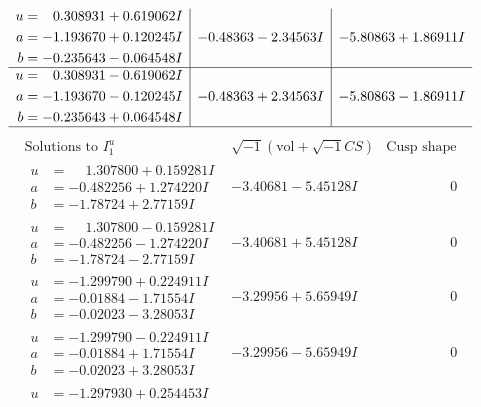 \documentclass[1p]{elsarticle_modified}
\theoremstyle{definition}
\newcommand{\I}{\sqrt{-1}}
\begin{document}
$$\begin{array}{c|c|c}
\begin{aligned}
u &= \phantom{-}0.308931 + 0.619062 I \\
a &= -1.193670 + 0.120245 I \\
b &= -0.235643 - 0.064548 I\end{aligned}
 & -0.48363 - 2.34563 I & -5.80863 + 1.86911 I \\ \hline\begin{aligned}
u &= \phantom{-}0.308931 - 0.619062 I \\
a &= -1.193670 - 0.120245 I \\
b &= -0.235643 + 0.064548 I\end{aligned}
 & -0.48363 + 2.34563 I & -5.80863 - 1.86911 I\\
 \hline 
 \end{array}$$\newpage$$\begin{array}{c|c|c}  
\text{Solutions to }I^u_{1}& \I (\text{vol} + \sqrt{-1}CS) & \text{Cusp shape}\\
 \hline 
\begin{aligned}
u &= \phantom{-}1.307800 + 0.159281 I \\
a &= -0.482256 + 1.274220 I \\
b &= -1.78724 + 2.77159 I\end{aligned}
 & -3.40681 - 5.45128 I & \phantom{-0.000000 } 0 \\ \hline\begin{aligned}
u &= \phantom{-}1.307800 - 0.159281 I \\
a &= -0.482256 - 1.274220 I \\
b &= -1.78724 - 2.77159 I\end{aligned}
 & -3.40681 + 5.45128 I & \phantom{-0.000000 } 0 \\ \hline\begin{aligned}
u &= -1.299790 + 0.224911 I \\
a &= -0.01884 - 1.71554 I \\
b &= -0.02023 - 3.28053 I\end{aligned}
 & -3.29956 + 5.65949 I & \phantom{-0.000000 } 0 \\ \hline\begin{aligned}
u &= -1.299790 - 0.224911 I \\
a &= -0.01884 + 1.71554 I \\
b &= -0.02023 + 3.28053 I\end{aligned}
 & -3.29956 - 5.65949 I & \phantom{-0.000000 } 0 \\ \hline\begin{aligned}
u &= -1.297930 + 0.254453 I \\

\end{aligned}
\end{array}$$
\end{document}
